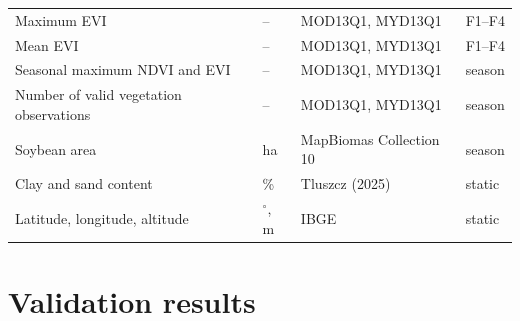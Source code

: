 \begin{table}[H]
\begin{tabular}{@{}llll@{}}
Maximum EVI & -- & MOD13Q1, MYD13Q1 & F1--F4 \\
Mean EVI & -- & MOD13Q1, MYD13Q1 & F1--F4 \\
Seasonal maximum NDVI and EVI & -- & MOD13Q1, MYD13Q1 & season \\
Number of valid vegetation observations & -- & MOD13Q1, MYD13Q1 & season \\
Soybean area & ha & MapBiomas Collection 10 & season \\
Clay and sand content & \% & Tluszcz (2025) & static \\
Latitude, longitude, altitude & $^\circ$, m & IBGE & static \\
\bottomrule
\end{tabular}
\end{table}


\section{Validation results}


